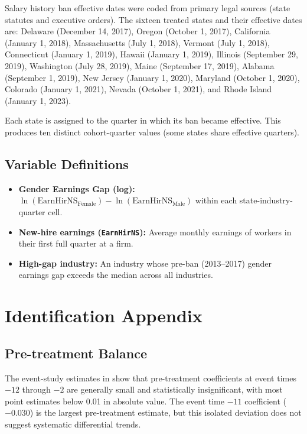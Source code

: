 \documentclass[12pt]{article}
\begin{document}
Salary history ban effective dates were coded from primary legal sources (state statutes and executive orders). The sixteen treated states and their effective dates are: Delaware (December 14, 2017), Oregon (October 1, 2017), California (January 1, 2018), Massachusetts (July 1, 2018), Vermont (July 1, 2018), Connecticut (January 1, 2019), Hawaii (January 1, 2019), Illinois (September 29, 2019), Washington (July 28, 2019), Maine (September 17, 2019), Alabama (September 1, 2019), New Jersey (January 1, 2020), Maryland (October 1, 2020), Colorado (January 1, 2021), Nevada (October 1, 2021), and Rhode Island (January 1, 2023).

Each state is assigned to the quarter in which its ban became effective. This produces ten distinct cohort-quarter values (some states share effective quarters).

\subsection{Variable Definitions}

\begin{itemize}
  \item \textbf{Gender Earnings Gap (log):} $\ln(\text{EarnHirNS}_{\text{Female}}) - \ln(\text{EarnHirNS}_{\text{Male}})$ within each state-industry-quarter cell.
  \item \textbf{New-hire earnings (\texttt{EarnHirNS}):} Average monthly earnings of workers in their first full quarter at a firm.
  \item \textbf{High-gap industry:} An industry whose pre-ban (2013--2017) gender earnings gap exceeds the median across all industries.
\end{itemize}


\section{Identification Appendix}

\subsection{Pre-treatment Balance}

The event-study estimates in  show that pre-treatment coefficients at event times $-12$ through $-2$ are generally small and statistically insignificant, with most point estimates below 0.01 in absolute value. The event time $-11$ coefficient ($-0.030$) is the largest pre-treatment estimate, but this isolated deviation does not suggest systematic differential trends.
\end{document}
